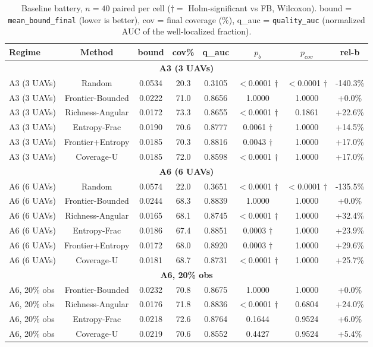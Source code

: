 \documentclass[journal]{IEEEtran}
\begin{document}
\begin{table}[t]
\caption{Baseline battery, $n = 40$ paired per cell ($\dagger =$ Holm-significant vs FB, Wilcoxon). bound = \texttt{mean\_bound\_final} (lower is better), cov = final coverage (\%), q\_auc = \texttt{quality\_auc} (normalized AUC of the well-localized fraction).}
\label{tab:base}
\centering
\begin{tabular}{l c c c c c c c}
\toprule
Regime & Method & bound & cov\% & q\_auc & $p_b$ & $p_{cov}$ & rel-b \\
\midrule
\multicolumn{8}{c}{\textbf{A3 (3 UAVs)}} \\
\midrule
A3 (3 UAVs) & Random & 0.0534 & 20.3 & 0.3105 & $<$0.0001 $\dagger$ & $<$0.0001 $\dagger$ & -140.3\% \\
A3 (3 UAVs) & Frontier-Bounded & 0.0222 & 71.0 & 0.8656 & 1.0000 & 1.0000 & +0.0\% \\
A3 (3 UAVs) & Richness-Angular & 0.0172 & 73.3 & 0.8655 & $<$0.0001 $\dagger$ & 0.1861 & +22.6\% \\
A3 (3 UAVs) & Entropy-Frac & 0.0190 & 70.6 & 0.8777 & 0.0061 $\dagger$ & 1.0000 & +14.5\% \\
A3 (3 UAVs) & Frontier+Entropy & 0.0185 & 70.3 & 0.8816 & 0.0043 $\dagger$ & 1.0000 & +17.0\% \\
A3 (3 UAVs) & Coverage-U & 0.0185 & 72.0 & 0.8598 & $<$0.0001 $\dagger$ & 1.0000 & +17.0\% \\
\multicolumn{8}{c}{\textbf{A6 (6 UAVs)}} \\
\midrule
A6 (6 UAVs) & Random & 0.0574 & 22.0 & 0.3651 & $<$0.0001 $\dagger$ & $<$0.0001 $\dagger$ & -135.5\% \\
A6 (6 UAVs) & Frontier-Bounded & 0.0244 & 68.3 & 0.8839 & 1.0000 & 1.0000 & +0.0\% \\
A6 (6 UAVs) & Richness-Angular & 0.0165 & 68.1 & 0.8745 & $<$0.0001 $\dagger$ & 1.0000 & +32.4\% \\
A6 (6 UAVs) & Entropy-Frac & 0.0186 & 67.4 & 0.8851 & 0.0003 $\dagger$ & 1.0000 & +23.9\% \\
A6 (6 UAVs) & Frontier+Entropy & 0.0172 & 68.0 & 0.8920 & 0.0003 $\dagger$ & 1.0000 & +29.6\% \\
A6 (6 UAVs) & Coverage-U & 0.0181 & 68.7 & 0.8731 & $<$0.0001 $\dagger$ & 1.0000 & +25.7\% \\
\multicolumn{8}{c}{\textbf{A6, 20\% obs}} \\
\midrule
A6, 20\% obs & Frontier-Bounded & 0.0232 & 70.8 & 0.8675 & 1.0000 & 1.0000 & +0.0\% \\
A6, 20\% obs & Richness-Angular & 0.0176 & 71.8 & 0.8836 & $<$0.0001 $\dagger$ & 0.6804 & +24.0\% \\
A6, 20\% obs & Entropy-Frac & 0.0218 & 72.6 & 0.8764 & 0.1644 & 0.9524 & +6.0\% \\
A6, 20\% obs & Coverage-U & 0.0219 & 70.6 & 0.8552 & 0.4427 & 0.9524 & +5.4\% \\
\bottomrule
\end{tabular}
\end{table}
\end{document}
